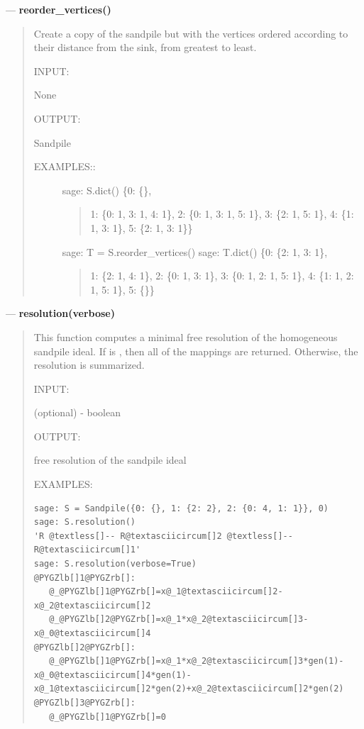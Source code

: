 \documentclass[letterpaper,10pt,english]{manual}
\begin{document}
---
\hypertarget{reorder-vertices}{}
\textbf{reorder\_vertices()}
\begin{quote}

Create a copy of the sandpile but with the vertices ordered according
to their distance from the sink, from greatest to least.

INPUT:

None

OUTPUT:

Sandpile
\begin{description}
\item[EXAMPLES::]
sage: S.dict()
\{0: \{\},
\begin{quote}

1: \{0: 1, 3: 1, 4: 1\},
2: \{0: 1, 3: 1, 5: 1\},
3: \{2: 1, 5: 1\},
4: \{1: 1, 3: 1\},
5: \{2: 1, 3: 1\}\}
\end{quote}

sage: T = S.reorder\_vertices()
sage: T.dict()
\{0: \{2: 1, 3: 1\},
\begin{quote}

1: \{2: 1, 4: 1\},
2: \{0: 1, 3: 1\},
3: \{0: 1, 2: 1, 5: 1\},
4: \{1: 1, 2: 1, 5: 1\},
5: \{\}\}
\end{quote}

\end{description}
\end{quote}

---
\hypertarget{resolution-verbose}{}
\textbf{resolution(verbose)}
\begin{quote}

This function computes a minimal free resolution of the homogeneous
sandpile ideal.  If  is , then all of the mappings
are returned.  Otherwise, the resolution is summarized.

INPUT:

 (optional) - boolean

OUTPUT:

free resolution of the sandpile ideal

EXAMPLES:

\begin{Verbatim}[commandchars=@\[\]]
sage: S = Sandpile({0: {}, 1: {2: 2}, 2: {0: 4, 1: 1}}, 0)
sage: S.resolution()
'R @textless[]-- R@textasciicircum[]2 @textless[]-- R@textasciicircum[]1'
sage: S.resolution(verbose=True)
@PYGZlb[]1@PYGZrb[]:
   @_@PYGZlb[]1@PYGZrb[]=x@_1@textasciicircum[]2-x@_2@textasciicircum[]2
   @_@PYGZlb[]2@PYGZrb[]=x@_1*x@_2@textasciicircum[]3-x@_0@textasciicircum[]4
@PYGZlb[]2@PYGZrb[]:
   @_@PYGZlb[]1@PYGZrb[]=x@_1*x@_2@textasciicircum[]3*gen(1)-x@_0@textasciicircum[]4*gen(1)-x@_1@textasciicircum[]2*gen(2)+x@_2@textasciicircum[]2*gen(2)
@PYGZlb[]3@PYGZrb[]:
   @_@PYGZlb[]1@PYGZrb[]=0
\end{Verbatim}
\end{quote}
\end{document}
